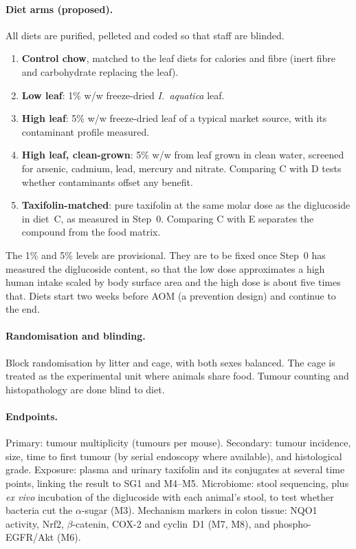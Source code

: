 \documentclass[11pt,a4paper]{article}
\newcommand{\Ia}{\emph{I.~aquatica}}
\begin{document}
\paragraph{Diet arms (proposed).} All diets are purified, pelleted and coded so that staff are blinded.
\begin{enumerate}[label=\textbf{\Alph*.}, itemsep=1pt]
\item \textbf{Control chow}, matched to the leaf diets for calories and fibre (inert fibre and carbohydrate replacing the leaf).
\item \textbf{Low leaf}: 1\% w/w freeze-dried \Ia{} leaf.
\item \textbf{High leaf}: 5\% w/w freeze-dried leaf of a typical market source, with its contaminant profile measured.
\item \textbf{High leaf, clean-grown}: 5\% w/w from leaf grown in clean water, screened for arsenic, cadmium, lead, mercury and nitrate. Comparing C with D tests whether contaminants offset any benefit.
\item \textbf{Taxifolin-matched}: pure taxifolin at the same molar dose as the diglucoside in diet~C, as measured in Step~0. Comparing C with E separates the compound from the food matrix.
\end{enumerate}
The 1\% and 5\% levels are provisional. They are to be fixed once Step~0 has measured the diglucoside content, so that the low dose approximates a high human intake scaled by body surface area and the high dose is about five times that. Diets start two weeks before AOM (a prevention design) and continue to the end.

\paragraph{Randomisation and blinding.} Block randomisation by litter and cage, with both sexes balanced. The cage is treated as the experimental unit where animals share food. Tumour counting and histopathology are done blind to diet.

\paragraph{Endpoints.} Primary: tumour multiplicity (tumours per mouse). Secondary: tumour incidence, size, time to first tumour (by serial endoscopy where available), and histological grade. Exposure: plasma and urinary taxifolin and its conjugates at several time points, linking the result to SG1 and M4--M5. Microbiome: stool sequencing, plus \emph{ex vivo} incubation of the diglucoside with each animal's stool, to test whether bacteria cut the $\alpha$-sugar (M3). Mechanism markers in colon tissue: NQO1 activity, Nrf2, $\beta$-catenin, COX-2 and cyclin~D1 (M7, M8), and phospho-EGFR/Akt (M6).
\end{document}

